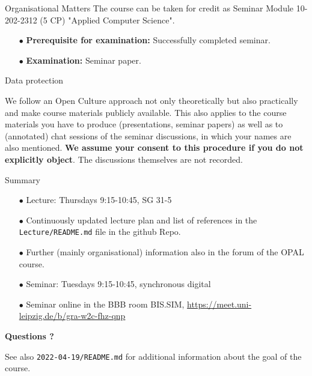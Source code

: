 \documentclass{beamer}
\begin{document}
\begin{frame}{Organisational Matters}
The course can be taken for credit as Seminar Module 10-202-2312 (5 CP)
"Applied Computer Science".
\begin{itemize}
\item[$\bullet$] \textbf{Prerequisite for examination:} Successfully
  completed seminar.
\item[$\bullet$] \textbf{Examination:} Seminar paper.
\end{itemize}
\end{frame}

\begin{frame}{Data protection}

We follow an Open Culture approach not only theoretically but also practically
and make course materials publicly available. This also applies to the course
materials you have to produce (presentations, seminar papers) as well as to
(annotated) chat sessions of the seminar discussions, in which your names are
also mentioned. \textbf{We assume your consent to this procedure if you do not
  explicitly object}. The discussions themselves are not recorded.

\end{frame}

\begin{frame}{Summary}

\begin{itemize}
\item[$\bullet$] Lecture: Thursdays 9:15-10:45, SG 31-5
\item[$\bullet$] Continuously updated lecture plan and list of references in
  the \texttt{Lecture/README.md} file in the github Repo.  
\item[$\bullet$] Further (mainly organisational) information also in the forum
  of the OPAL course.
\item[$\bullet$] Seminar: Tuesdays 9:15-10:45, synchronous digital
\item[$\bullet$] Seminar online in the BBB room BIS.SIM,
  \url{https://meet.uni-leipzig.de/b/gra-w2c-fhz-qnp}
\end{itemize}
\begin{center}\LARGE\bf
  Questions ?
\end{center}

See also \texttt{2022-04-19/README.md} for additional information about the
goal of the course. 

\end{frame}
\end{document}
